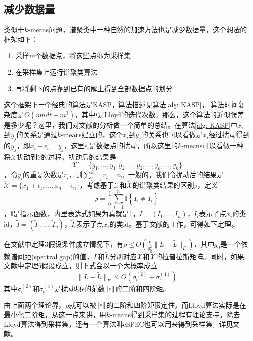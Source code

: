 \subsection{减少数据量}
类似于$k$-means问题，谱聚类中一种自然的加速方法也是减少数据量，这个想法的框架如下：
\begin{enumerate}
    \item 采样$m$个数据点，将这些点称为采样集
    \item 在采样集上运行谱聚类算法
    \item 再将剩下的点靠到已有的解上得到全部数据点的划分
\end{enumerate}
这个框架下一个经典的算法是KASP，算法描述见算法\ref{alg: KASP}，
算法时间复杂度是$O(nmdt+m^3)$，其中$t$是Lloyd的迭代次数。那么，这个算法的近似误差是多少呢？这里，我们对文献\cite{yan2009fast}的分析做一个简单的总结。在算法\ref{alg: KASP}中$x_i$到$y_j$的关系是通过$k$-means建立的，这个$x_i$到$y_j$的关系也可以看做是$x_i$经过扰动得到的$y_j$，即$x_i+\epsilon_i = y_j$，这里$\epsilon_i$是数据点的扰动，所以这里的$k$-means可以看做一种将$\mathcal{X}$扰动到$Y$的过程，扰动后的结果是$$\mathcal{X}' = \{y_1,...,y_1,y_2,...,y_2,...,y_k,...,y_k\}$$，令$y_i$的重复次数是$r_i$，则$\sum_{i=1}^k r_i = n$。一般的，我们令扰动后的结果是$\tilde{\mathcal{X}} = \{x_1+\epsilon_1,...,x_n+\epsilon_n\}$，考虑基于$\mathcal{X}$和$\tilde{\mathcal{X}}$的谱聚类结果的区别$\rho$，定义$$\rho=\frac{1}{n} \sum_{i=1}^{n} \mathbb{I}\left\{I_{i} \neq \tilde{I}_{i}\right\}$$，$\mathbb{I}$是指示函数，内里表达式如果为真就是1，$I = (I_1,...,I_n)$，$I_i$表示了点$x_i$的类id，$\tilde{I} = (\tilde{I}_1,...,\tilde{I}_n)$，$\tilde{I}_i$表示了点$\tilde{x}_i$的类id。基于文献\cite{huang2009spectral}的工作，可得如下定理。
\begin{theorem}[KASP的理论保证]
    在文献\cite{yan2009fast}中定理3假设条件成立情况下，有$\rho \leq O\left(\frac{k}{g_{0}^{2}}\|L-\tilde{L}\|_{F}\right)$，其中$g_0$是一个依赖谱间距(spectral gap)的值，$L$和$\tilde{L}$分别对应$\mathcal{X}$和$\tilde{\mathcal{X}}$的拉普拉斯矩阵。同时，如果文献\cite{yan2009fast}中定理6假设成立，则下式会以一个大概率成立
    \begin{equation*}
        \|L-\tilde{L}\|_{F} \leq O\left(\sigma_{\epsilon}^{(2)}+\sigma_{\epsilon}^{(4)}\right)
    \end{equation*}
    其中$\sigma_{\epsilon}^{(2)}$和$\sigma_{\epsilon}^{(4)}$是扰动项$\epsilon$的范数$\left\lVert\epsilon\right\rVert$的二阶和四阶矩。
\end{theorem}
由上面两个理论界，$\rho$就可以被$\left\lVert\epsilon\right\rVert$的二阶和四阶矩限定住，而Lloyd算法实际是在最小化二阶矩，从这一点来讲，用$k$-means得到采样集的过程有理论支持。除去Lloyd算法得到采样集，还有一个算法叫eSPEC也可以用来得到采样集，详见文献\cite{wang2009approximate}。
